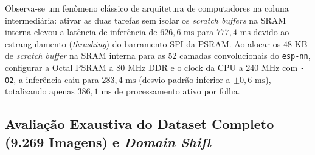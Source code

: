 \documentclass[12pt]{article}
\begin{document}
\begin{table}[htbp]
\centering
\caption{Evolução das Métricas de Latência e Vazão no Hardware Físico ESP32-S3 (550 Amostras)}
\label{tab:desempenho_hardware}
\end{table}

Observa-se um fenômeno clássico de arquitetura de computadores na coluna intermediária: ativar as duas tarefas sem isolar os \textit{scratch buffers} na SRAM interna elevou a latência de inferência de $626,6\text{ ms}$ para $777,4\text{ ms}$ devido ao estrangulamento (\textit{thrashing}) do barramento SPI da PSRAM. Ao alocar os $48\text{ KB}$ de \textit{scratch buffer} na SRAM interna para as 52 camadas convolucionais do \texttt{esp-nn}, configurar a Octal PSRAM a $80\text{ MHz}$ DDR e o clock da CPU a $240\text{ MHz}$ com \texttt{-O2}, a inferência caiu para \textbf{$283,4\text{ ms}$} (desvio padrão inferior a $\pm 0,6\text{ ms}$), totalizando apenas \textbf{$386,1\text{ ms}$} de processamento ativo por folha.

\subsection{Avaliação Exaustiva do Dataset Completo (9.269 Imagens) e \textit{Domain Shift}}
\end{document}
